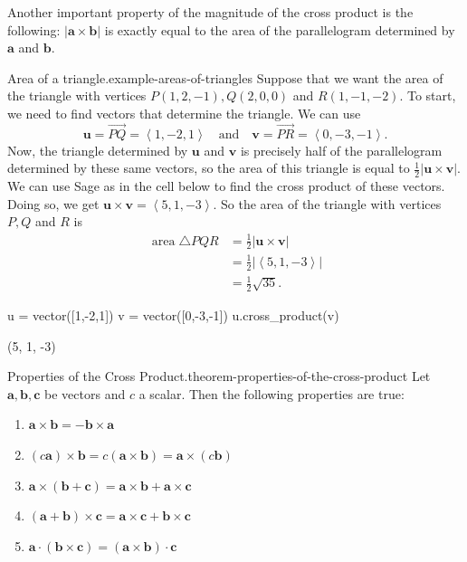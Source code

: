 \documentclass[10pt,]{book}
\numberwithin{equation}{section}
\newcommand{\vv}[1]{\mathbf{#1}}
\newcommand{\dotprod}[1]{\left\langle #1 \right\rangle}
\begin{document}
Another important property of the magnitude of the cross product is the following: \(|\vv{a}\times\vv{b}|\) is exactly equal to the area of the parallelogram determined by \(\vv{a}\) and \(\vv{b}\).%
\begin{example}{Area of a triangle.}{example-areas-of-triangles}%
\hypertarget{p-1182}{}%
Suppose that we want the area of the triangle with vertices \(P(1,2,-1), Q(2,0,0)\) and \(R(1,-1,-2)\). To start, we need to find vectors that determine the triangle. We can use%
%
\begin{equation*}
\vv{u} = \vec{PQ} = \dotprod{1,-2,1}\quad\text{and}\quad\vv{v} = \vec{PR} = \dotprod{0,-3,-1}.
\end{equation*}
\hypertarget{p-1183}{}%
Now, the triangle determined by \(\vv{u}\) and \(\vv{v}\) is precisely half of the parallelogram determined by these same vectors, so the area of this triangle is equal to \(\frac{1}{2}|\vv{u}\times\vv{v}|\). We can use Sage as in the cell below to find the cross product of these vectors. Doing so, we get \(\vv{u}\times\vv{v} = \dotprod{5,1,-3}.\) So the area of the triangle with vertices \(P,Q\) and \(R\) is%
%
\begin{align*}
\operatorname{area} \triangle PQR & = \frac{1}{2}|\vv{u}\times\vv{v}| \\
& = \frac{1}{2}|\dotprod{5,1,-3}| \\
& = \frac{1}{2}\sqrt{35}. 
\end{align*}
\end{example}
\begin{sageinput}
u = vector([1,-2,1])
v = vector([0,-3,-1])
u.cross_product(v)
\end{sageinput}
\begin{sageoutput}
(5, 1, -3)
\end{sageoutput}
\begin{theorem}{Properties of the Cross Product.}{}{theorem-properties-of-the-cross-product}%
\hypertarget{p-1184}{}%
Let \(\vv{a},\vv{b},\vv{c}\) be vectors and \(c\) a scalar. Then the following properties are true:%
\leavevmode%
\begin{multicols}{2}
\begin{enumerate}
\item\hypertarget{li-123}{}\(\vv{a}\times\vv{b} = -\vv{b}\times\vv{a}\)%
\item\hypertarget{li-124}{}\((c\vv{a})\times\vv{b} = c(\vv{a}\times\vv{b}) = \vv{a}\times(c\vv{b})\)%
\item\hypertarget{li-125}{}\(\vv{a}\times(\vv{b}+\vv{c}) = \vv{a}\times\vv{b}+\vv{a}\times\vv{c}\)%
\item\hypertarget{li-126}{}\((\vv{a}+\vv{b})\times\vv{c} = \vv{a}\times\vv{c}+\vv{b}\times\vv{c}\)%
\item\hypertarget{li-127}{}\(\vv{a}\cdot(\vv{b}\times\vv{c}) = (\vv{a}\times\vv{b})\cdot\vv{c}\)%
\end{enumerate}
\end{multicols}
\end{theorem}
\end{document}
